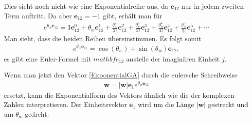 Dies sieht noch nicht wie eine Exponentialreihe aus, da $\mathbf{e}_{12}$ nur in jedem zweiten Term auftritt. Da aber $\mathbf{e}_{12}=-1$ gibt, erhält man für
\begin{align}
	e^{\theta_w\mathbf{e}_{12}} = 1 \mathbf{e}_{12}^0+\theta_w\mathbf{e}_{12}^1+{\frac {\theta_w^{2}}{2!}}\mathbf{e}_{12}^2+{\frac {\theta_w^{3}}{3!}}\mathbf{e}_{12}^3+{\frac {\theta_w^{4}}{4!}}\mathbf{e}_{12}^4+{\frac {\theta_w^{5}}{5!}}\mathbf{e}_{12}^5+\cdots
	\label{ExponentialGA2}
\end{align}
Man sieht, dass die beiden Reihen übereinstimmen. Es folgt somit
\begin{align}\label{EulerGA}
	e^{\theta_w \mathbf{e}_{12}} = \cos(\theta_w)+ \sin(\theta_w) \mathbf{e}_{12},
\end{align} 
es gibt eine Euler-Formel mit $mathbf{e}_{12}$ anstelle der imaginären Einheit $j$.

Wenn man jetzt den Vektor \eqref{ExponentialGA} durch die eulersche Schreibweise
\begin{align}
	\mathbf{w} = |\mathbf{w}|\mathbf{e}_1e^{\theta_w\mathbf{e}_{12}}
\end{align}
ersetzt, kann die Exponentialform des Vektors ähnlich wie die der komplexen Zahlen interpretieren. Der Einheitsvektor $\mathbf{e}_1$ wird um die Länge $|\mathbf{w}|$ gestreckt und um $\theta_w$ gedreht.
